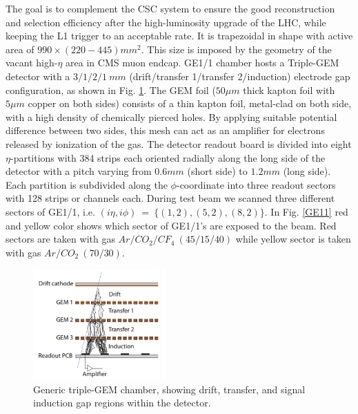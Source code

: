 The goal is to complement the CSC system to ensure the good reconstruction and selection efficiency after the high-luminosity upgrade of the LHC, while keeping the L1 trigger to an acceptable rate. 
It is trapezoidal in shape with active area of $990\times (220-445)mm^2$. This size is imposed by the geometry of the vacant high-$\eta$ area in CMS muon endcap. GE1/1 chamber hosts a Triple-GEM detector with a $3/1/2/1~mm$ (drift/transfer 1/transfer 2/induction) electrode gap configuration, as shown in Fig. \ref{GEM:cascade}. The GEM foil ($50\mu m$ thick kapton foil with $5\mu m$ copper on both sides) consists of a thin kapton foil, metal-clad on both side, with a high density of chemically pierced holes. By applying suitable potential difference between two sides, this mesh can act as an amplifier for electrons released by ionization of the gas. The detector readout board is divided into eight $\eta$-partitions with 384 strips each oriented radially along the long side of the detector with a pitch varying from $0.6mm$ (short side) to $1.2mm$ (long side). Each partition is subdivided along the $\phi$-coordinate into three readout sectors with 128 strips or channels each. During test beam we scanned three different sectors of GE1/1, i.e. $(i\eta,i\phi)~=~\{(1,2),(5,2),(8,2)\}$. In Fig. \ref{GE11} red and yellow color shows which sector of GE1/1's are exposed to the beam. Red sectors are taken with gas $Ar/CO_2/CF_4~(45/15/40) $ while yellow sector is taken with gas $Ar/CO_2~(70/30)$.

\begin{figure}[!htbp]
\centering
\includegraphics[width=2.0in]{figures/GEM/GEMCascade.png}
\caption{Generic triple-GEM chamber, showing drift, transfer, and signal induction gap regions within the detector.}
\label{GEM:cascade}
\end{figure}



